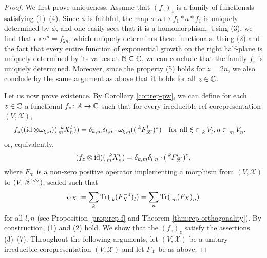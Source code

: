 \begin{proof}
  We first prove uniqueness.  Assume that $(f_{z})_{z}$ is a family of
  functionals satisfying (1)--(4).  Since $\phi$ is faithful, the map
  $\sigma\colon a \mapsto f_{1} \ast a \ast f_{1}$ is uniquely
  determined by $\phi$, and one easily sees that it is a homomorphism. Using
  (3), we find that $\epsilon \circ \sigma^n=f_{2n}$, which uniquely determines these functionals. Using (2) and the
  fact that every entire function of exponential growth on the right
  half-plane is uniquely determined by its values at $\mathbb{N} \subseteq \mathbb{C}$, we can conclude that the family $f_{z}$ is uniquely determined. Moreover, since the property (5) holds for $z = 2n$, we also conclude by the same argument as above that it holds for all $z\in \mathbb{C}$.

  Let us now prove existence.  By Corollary \ref{cor:rep-pw}, we can
  define for each $z\in \mathbb{C}$ a functional $f_{z} \colon A \to \mathbb{C}$ such
  that for every irreducible rcf corepresentation
  $(V,\mathscr{X})$,
    \begin{align*}
      f_{z}((\id \otimes \omega_{\xi,\eta})(\Gr{X}{k}{l}{m}{n})) &=
      \delta_{k,m}\delta_{l,n} \cdot
      \omega_{\xi,\eta}((\Gr{F}{k}{l}{}{\mathscr{X}})^{z}) \quad \text{for all }
      \xi \in \Gru{V}{k}{l},\eta \in
      \Gru{V}{m}{n},
    \end{align*}
    or, equivalently,
    \begin{align*}
      (f_{z} \otimes \id)(\Gr{X}{k}{l}{m}{n}) =
      \delta_{k,m}\delta_{l,n} \cdot (\Gr{F}{k}{l}{}{\mathscr{X}})^{z},
    \end{align*}
    where $F_{\mathscr{X}}$ is a non-zero positive operator implementing a morphism from $(V,\mathscr{X})$ to
    $(V, \mathscr{X}^{\vee}\!{}^{\vee})$, scaled such that
    \begin{align*}
      \alpha_{X}:= \sum_{k} \Tr(\Grd{(F_{X}^{-1})}{k}{l}) = \sum_{n}
      \Tr(\Grd{(F_{X})}{m}{n})
    \end{align*}
    for all $l,n$ (see Proposition \ref{prop:rep-f} and Theorem \ref{thm:rep-orthogonality}). By
    construction, (1) and (2) hold. We show that the $(f_{z})_{z}$ satisfy the
    assertions (3)--(7). 
    Throughout the following arguments, let 
    $(V,\mathscr{X})$ be a unitary irreducible corepresentation
    $(V,\mathscr{X})$ and let $F_{\mathscr{X}}$ be as above.


\end{proof}
